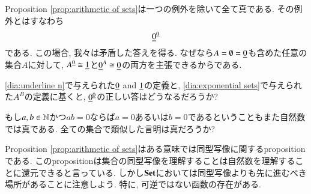 \begin{exercise}\label{exc:0 to the 0}
Proposition \ref{prop:arithmetic of sets}は一つの例外を除いて全て真である. その例外とはすなわち$$\underline{0}^{\underline{0}}$$である. この場合, 我々は矛盾した答えを得る. なぜなら$A=\emptyset=\underline{0}$も含めた任意の集合$A$に対して, $A^{\underline{0}}\cong\underline{1}$と$\underline{0}^A\cong\underline{0}$の両方を主張できるからである.

\eqref{dia:underline n}で与えられた$\underline{0}$ and $\underline{1}$の定義と, \eqref{dia:exponential sets}で与えられた$A^B$の定義に基くと, $\underline{0}^{\underline{0}}$の正しい答はどうなるだろうか?
\end{exercise}

\begin{exercise}
もし$a,b\in{\mathbb N}$かつ$ab=0$ならば$a=0$あるいは$b=0$であるということもまた自然数では真である. 全ての集合で類似した言明は真だろうか?
\end{exercise}


Proposition \ref{prop:arithmetic of sets}はある意味では同型写像に関するpropositionである. このpropositionは集合の同型写像を理解することは自然数を理解することに還元できると言っている. しかし$\mathbf{Set}$においては同型写像よりも先に進むべき場所があることに注意しよう. 特に, 可逆ではない函数の存在がある.


